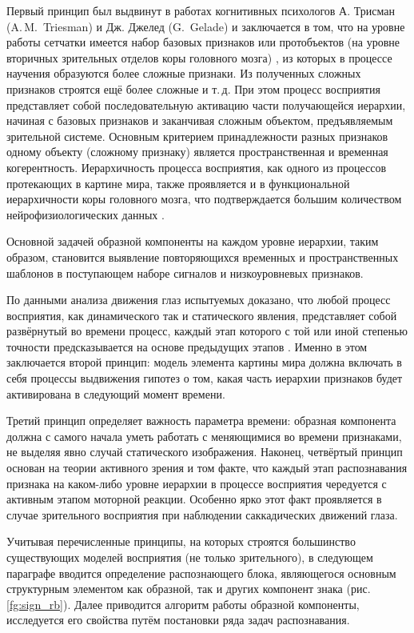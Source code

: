 Первый принцип был выдвинут в работах когнитивных психологов А. Трисман (A.\,M.~Triesman) и Дж. Джелед (G.~Gelade) \cite{Triesman1980} и заключается в том, что на уровне работы сетчатки имеется набор базовых признаков  или протобъектов (на уровне вторичных зрительных отделов коры головного мозга) \cite{Rensink2000}, из которых в процессе научения образуются более сложные признаки. Из полученных сложных признаков строятся ещё более сложные и т.\,д. При этом процесс восприятия представляет собой последовательную активацию части получающейся иерархии, начиная с базовых признаков и заканчивая сложным объектом, предъявляемым зрительной системе. Основным критерием принадлежности разных признаков одному объекту (сложному признаку) является пространственная и временная когерентность. Иерархичность процесса восприятия, как одного из процессов протекающих в картине мира, также проявляется и в функциональной иерархичности коры головного мозга, что подтверждается большим количеством нейрофизиологических данных \cite{Hawkins2009, Bolotova2011}.

Основной задачей образной компоненты на каждом уровне иерархии, таким образом, становится выявление повторяющихся временных и пространственных шаблонов в поступающем наборе сигналов и низкоуровневых признаков.

По данными анализа движения глаз испытуемых доказано, что любой процесс восприятия, как динамического так и статического явления, представляет собой развёрнутый во времени процесс, каждый этап которого с той или иной степенью точности предсказывается на основе предыдущих этапов \cite{Velichkovsky2006, Hawkins2009}. Именно в этом заключается второй принцип: модель элемента картины мира должна включать в себя процессы выдвижения гипотез о том, какая часть иерархии признаков будет активирована в следующий момент времени.

Третий принцип определяет важность параметра времени: образная компонента должна с самого начала уметь работать с меняющимися во времени признаками, не выделяя явно случай статического изображения. Наконец, четвёртый принцип основан на теории активного зрения и том факте, что каждый этап распознавания признака на каком-либо уровне иерархии в процессе восприятия чередуется с активным этапом моторной реакции. Особенно ярко этот факт проявляется в случае зрительного восприятия при наблюдении саккадических движений глаза.

Учитывая перечисленные принципы, на которых строятся большинство существующих моделей восприятия (не только зрительного), в следующем параграфе вводится определение распознающего блока, являющегося основным структурным элементом как образной, так и других компонент знака (рис. \ref{fg:sign_rb}). Далее приводится алгоритм работы образной компоненты, исследуется его свойства путём постановки ряда задач распознавания.

